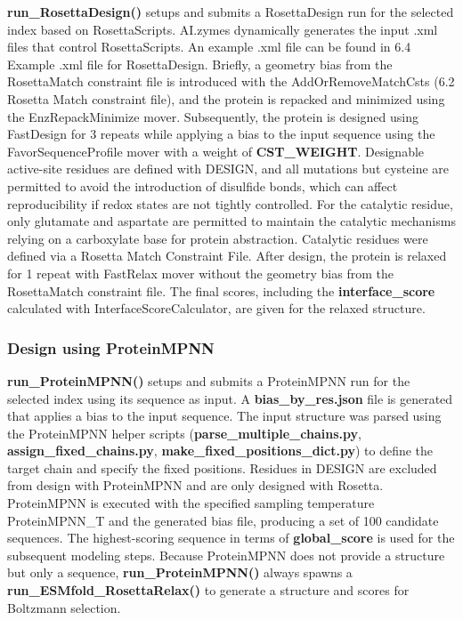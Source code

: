\documentclass[10pt]{extarticle}
\begin{document}
\textbf{run\_RosettaDesign()} setups and submits a RosettaDesign run for the selected index based on RosettaScripts. AI.zymes dynamically generates the input .xml files that control RosettaScripts. An example .xml file can be found in 6.4 Example .xml file for RosettaDesign. Briefly, a geometry bias from the RosettaMatch constraint file is introduced with the AddOrRemoveMatchCsts (6.2 Rosetta Match constraint file), and the protein is repacked and minimized using the EnzRepackMinimize mover. Subsequently, the protein is designed using FastDesign for 3 repeats while applying a bias to the input sequence using the FavorSequenceProfile mover with a weight of \textbf{CST\_WEIGHT}. Designable active-site residues are defined with DESIGN, and all mutations but cysteine are permitted to avoid the introduction of disulfide bonds, which can affect reproducibility if redox states are not tightly controlled. For the catalytic residue, only glutamate and aspartate are permitted to maintain the catalytic mechanisms relying on a carboxylate base for protein abstraction. Catalytic residues were defined via a Rosetta Match Constraint File. After design, the protein is relaxed for 1 repeat with FastRelax mover without the geometry bias from the RosettaMatch constraint file. The final scores, including the \textbf{interface\_score} calculated with InterfaceScoreCalculator, are given for the relaxed structure.

\subsubsection{Design using ProteinMPNN}

\textbf{run\_ProteinMPNN()} setups and submits a ProteinMPNN run for the selected index using its sequence as input. A \textbf{bias\_by\_res.json} file is generated that applies a bias to the input sequence. The input structure was parsed using the ProteinMPNN helper scripts (\textbf{parse\_multiple\_chains.py}, \textbf{assign\_fixed\_chains.py}, \textbf{make\_fixed\_positions\_dict.py}) to define the target chain and specify the fixed positions. Residues in DESIGN are excluded from design with ProteinMPNN and are only designed with Rosetta. ProteinMPNN is executed with the specified sampling temperature ProteinMPNN\_T and the generated bias file, producing a set of 100 candidate sequences. The highest-scoring sequence in terms of \textbf{global\_score} is used for the subsequent modeling steps. Because ProteinMPNN does not provide a structure but only a sequence, \textbf{run\_ProteinMPNN()} always spawns a \textbf{run\_ESMfold\_RosettaRelax()} to generate a structure and scores for Boltzmann selection.
\end{document}
